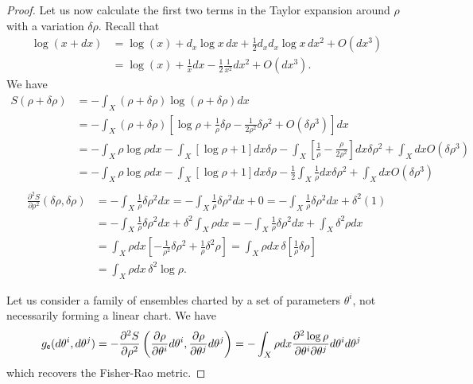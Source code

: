 \begin{mathSection}
\begin{proof}
	Let us now calculate the first two terms in the Taylor expansion around $\rho$ with a variation $\delta\rho$. Recall that
	\begin{equation}
		\begin{aligned}
			\log(x+dx) &= \log(x) + d_x \log x \, dx + \frac{1}{2} d_x d_x  \log x \, dx^2 + O(dx^3) \\
			&= \log(x) + \frac{1}{x} dx - \frac{1}{2} \frac{1}{x^2} dx^2 + O(dx^3).
		\end{aligned}
	\end{equation}
	We have
	\begin{equation}
		\begin{aligned}
			S(\rho + \delta \rho) &= -\int_X (\rho + \delta \rho) \log (\rho + \delta \rho) dx \\
			&=-\int_X (\rho + \delta \rho) \left[\log \rho + \frac{1}{\rho} \delta \rho - \frac{1}{2\rho^2} \delta \rho^2 + O(\delta \rho^3)\right] dx \\
			&= - \int_X \rho \log \rho dx - \int_X \left[\log \rho + 1 \right]dx \delta \rho -\int_X \left[\frac{1}{\rho} - \frac{\rho}{2\rho^2}\right] dx \delta \rho^2 + \int_X dx O(\delta\rho^3) \\
			&= - \int_X \rho \log \rho dx - \int_X \left[\log \rho + 1 \right]dx \delta \rho - 	
			\frac{1}{2}\int_X \frac{1}{\rho} dx \delta \rho^2 + \int_X dx O(\delta\rho^3) \\
		\end{aligned}
	\end{equation}
	\begin{equation}
		\begin{aligned}
			\frac{\partial^2 S}{\partial \rho^2}(\delta \rho, \delta \rho) &= -\int_X \frac{1}{\rho} \delta \rho^2 dx = -\int_X \frac{1}{\rho} \delta \rho^2 dx + 0 = -\int_X \frac{1}{\rho} \delta \rho^2 dx + \delta^2 (1) \\
			&= -\int_X \frac{1}{\rho} \delta \rho^2 dx + \delta^2 \int_X \rho dx = -\int_X \frac{1}{\rho} \delta \rho^2 dx + \int_X \delta^2 \rho dx \\
			&= \int_X \rho dx \left[-\frac{1}{\rho^2} \delta \rho^2 + \frac{1}{\rho} \delta^2 \rho \right]
			= \int_X \rho dx \, \delta \left[\frac{1}{\rho} \delta \rho \right] \\
			&= \int_X \rho dx \, \delta^2 \log \rho.
		\end{aligned}
	\end{equation}
	
	Let us consider a family of ensembles charted by a set of parameters $\theta^i$, not necessarily forming a linear chart. We have
	\begin{equation}
		\begin{aligned}
			g_{\mathsf{e}}(d\theta^i, d\theta^j) &= - \frac{\partial^2 S}{\partial \rho^2}\left(\frac{\partial 
				\rho}{\partial \theta^i} d\theta^i, \frac{\partial 
				\rho}{\partial \theta^j} d\theta^j\right) = - \int_X \rho dx \frac{\partial^2 \log \rho}{\partial \theta^i \partial \theta^j}d\theta^i d\theta^j
		\end{aligned}
	\end{equation}
	which recovers the Fisher-Rao metric.
\end{proof}


\end{mathSection}
